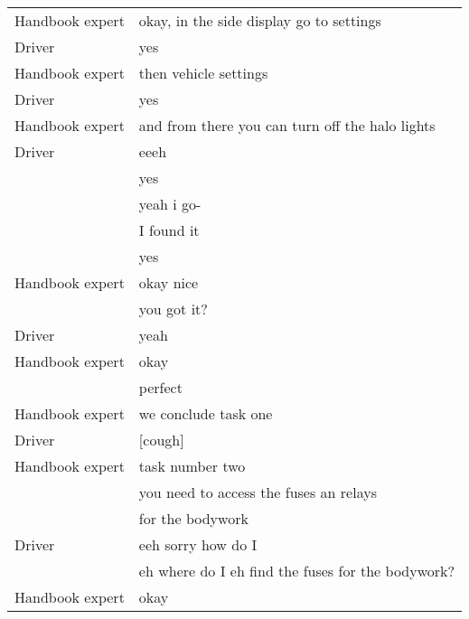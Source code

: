 \begin{table}[H]
\begin{tabular}{p{3cm}p{8cm}}
Handbook expert & okay, in the side display go to settings                        \\
Driver              & yes                                                             \\
Handbook expert & then vehicle settings                                           \\
Driver              & yes                                                             \\
Handbook expert & and from there you can turn off the halo lights                 \\
Driver              & eeeh                                                            \\
                    & yes                                                             \\
                    & yeah i go-                                                      \\
                    & I found it                                                      \\
                    & yes                                                             \\
Handbook expert & okay nice                                                       \\
                    & you got it?                                                     \\
Driver              & yeah                                                            \\
Handbook expert & okay                                                            \\
                    & perfect                                                         \\
Handbook expert & we conclude task one                                            \\
Driver              & {[}cough{]}                                                     \\
Handbook expert & task number two                                                 \\
                    & you need to access the fuses an relays                          \\
                    & for the bodywork                                                \\
Driver              & eeh sorry how do I                                              \\
                    & eh where do I eh find the fuses for the bodywork?               \\
Handbook expert & okay                                                            \\
\end{tabular}
\end{table}

